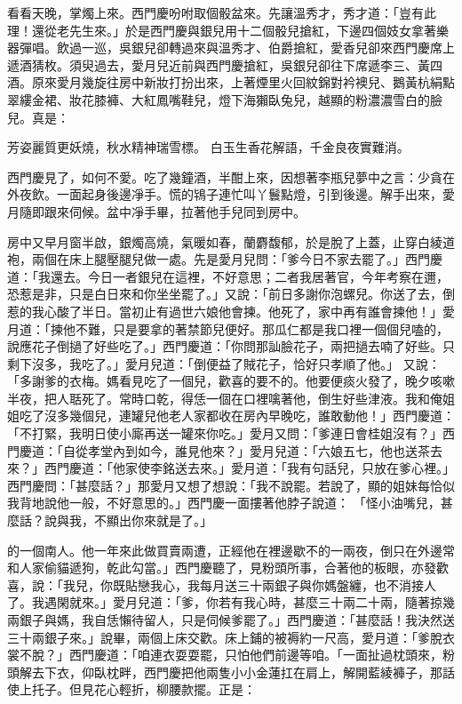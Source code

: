 看看天晚，掌燭上來。西門慶吩咐取個骰盆來。先讓溫秀才，秀才道：「豈有此理！還從老先生來。」於是西門慶與銀兒用十二個骰兒搶紅，下邊四個妓女拿著樂器彈唱。飲過一巡，吳銀兒卻轉過來與溫秀才、伯爵搶紅，愛香兒卻來西門慶席上遞酒猜枚。須臾過去，愛月兒近前與西門慶搶紅，吳銀兒卻往下席遞李三、黃四酒。原來愛月幾旋往房中新妝打扮出來，上著煙里火回紋錦對衿襖兒、鵝黃杭絹點翠縷金裙、妝花膝褲、大紅鳳嘴鞋兒，燈下海獺臥兔兒，越顯的粉濃濃雪白的臉兒。真是：

芳姿麗質更妖燒，秋水精神瑞雪標。
白玉生香花解語，千金良夜實難消。

西門慶見了，如何不愛。吃了幾鐘酒，半酣上來，因想著李瓶兒夢中之言：少貪在外夜飲。一面起身後邊凈手。慌的鴇子連忙叫丫鬟點燈，引到後邊。解手出來，愛月隨即跟來伺候。盆中凈手畢，拉著他手兒同到房中。

房中又早月窗半啟，銀燭高燒，氣暖如春，蘭麝馥郁，於是脫了上蓋，止穿白綾道袍，兩個在床上腿壓腿兒做一處。先是愛月兒問：「爹今日不家去罷了。」西門慶道：「我還去。今日一者銀兒在這裡，不好意思；二者我居著官，今年考察在邇，恐惹是非，只是白日來和你坐坐罷了。」又說：「前日多謝你泡螺兒。你送了去，倒惹的我心酸了半日。當初止有過世六娘他會揀。他死了，家中再有誰會揀他！」愛月道：「揀他不難，只是要拿的著禁節兒便好。那瓜仁都是我口裡一個個兒嗑的，說應花子倒撾了好些吃了。」西門慶道：「你問那訕臉花子，兩把撾去喃了好些。只剩下沒多，我吃了。」愛月兒道：「倒便益了賊花子，恰好只孝順了他。」 又說：「多謝爹的衣梅。媽看見吃了一個兒，歡喜的要不的。他要便痰火發了，晚夕咳嗽半夜，把人聒死了。常時口乾，得恁一個在口裡噙著他，倒生好些津液。我和俺姐姐吃了沒多幾個兒，連罐兒他老人家都收在房內早晚吃，誰敢動他！」西門慶道：「不打緊，我明日使小廝再送一罐來你吃。」愛月又問：「爹連日會桂姐沒有？」西門慶道：「自從孝堂內到如今，誰見他來？」愛月兒道：「六娘五七，他也送茶去來？」西門慶道：「他家使李銘送去來。」愛月道：「我有句話兒，只放在爹心裡。」西門慶問：「甚麼話？」那愛月又想了想說：「我不說罷。若說了，顯的姐妹每恰似我背地說他一般，不好意思的。」西門慶一面摟著他脖子說道： 「怪小油嘴兒，甚麼話？說與我，不顯出你來就是了。」

的一個南人。他一年來此做買賣兩遭，正經他在裡邊歇不的一兩夜，倒只在外邊常和人家偷貓遞狗，乾此勾當。」西門慶聽了，見粉頭所事，合著他的板眼，亦發歡喜，說：「我兒，你既貼戀我心，我每月送三十兩銀子與你媽盤纏，也不消接人了。我遇閑就來。」愛月兒道：「爹，你若有我心時，甚麼三十兩二十兩，隨著掠幾兩銀子與媽，我自恁懶待留人，只是伺候爹罷了。」西門慶道：「甚麼話！我決然送三十兩銀子來。」說畢，兩個上床交歡。床上鋪的被褥約一尺高，愛月道：「爹脫衣裳不脫？」西門慶道：「咱連衣耍耍罷，只怕他們前邊等咱。「一面扯過枕頭來，粉頭解去下衣，仰臥枕畔，西門慶把他兩隻小小金蓮扛在肩上，解開藍綾褲子，那話使上托子。但見花心輕折，柳腰款擺。正是：

